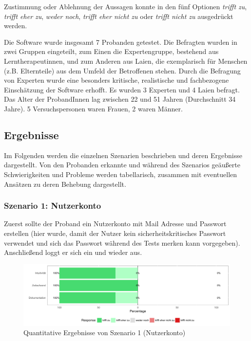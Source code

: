 Zustimmung oder Ablehnung der Aussagen konnte in den fünf Optionen \textit{trifft zu}, \textit{trifft eher zu}, \textit{weder noch}, \textit{trifft eher nicht zu} oder \textit{trifft nicht zu} ausgedrückt werden.

Die Software wurde insgesamt 7 Probanden getestet. Die Befragten wurden in zwei Gruppen eingeteilt, zum Einen die Expertengruppe, bestehend aus Lerntherapeutinnen, und zum Anderen aus Laien, die exemplarisch für Menschen (z.B. Elternteile) aus dem Umfeld der Betroffenen stehen. Durch die Befragung von Experten wurde eine besonders kritische, realistische und fachbezogene Einschätzung der Software erhofft. Es wurden 3 Experten und 4 Laien befragt. Das Alter der ProbandInnen lag zwischen 22 und 51 Jahren (Durchschnitt 34 Jahre). 5 Versuchspersonen waren Frauen, 2 waren Männer.\\

\subsection{Ergebnisse}

Im Folgenden werden die einzelnen Szenarien beschrieben und deren Ergebnisse dargestellt. Von den Probanden erkannte und während des Szenarios geäußerte Schwierigkeiten und Probleme werden tabellarisch, zusammen mit eventuellen Ansätzen zu deren Behebung dargestellt.

\subsubsection{Szenario 1: Nutzerkonto}

Zuerst sollte der Proband ein Nutzerkonto mit Mail Adresse und Passwort erstellen (hier wurde, damit der Nutzer kein sicherheitskritisches Passwort verwendet und sich das Passwort während des Tests merken kann  vorgegeben). Anschließend loggt er sich ein und wieder aus.

\begin{figure}[h!]
	\centering
	\includegraphics[width=.8\linewidth]{figures/evaluation/scenario1}
	\caption{Quantitative Ergebnisse von Szenario 1 (Nutzerkonto)}
	\label{fig:evaluation-sc1}
\end{figure}

